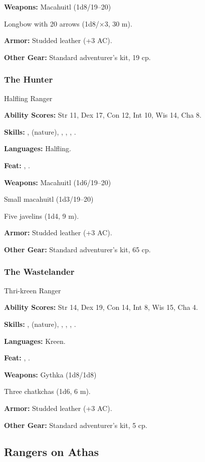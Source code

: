 \textbf{Weapons:} Macahuitl (1d8/19--20)

Longbow with 20 arrows (1d8/$\times$3, 30 m).

\textbf{Armor:} Studded leather (+3 AC).

\textbf{Other Gear:} Standard adventurer's kit, 19 cp.

\subsubsection{The Hunter}
Halfling Ranger

\textbf{Ability Scores:} Str 11, Dex 17, Con 12, Int 10, Wis 14, Cha 8.

\textbf{Skills:} ,  (nature), , , , .

\textbf{Languages:} Halfling.

\textbf{Feat:} , .

\textbf{Weapons:} Macahuitl (1d6/19--20)

Small macahuitl (1d3/19--20)

Five javelins (1d4, 9 m).

\textbf{Armor:} Studded leather (+3 AC).

\textbf{Other Gear:} Standard adventurer's kit, 65 cp.

\subsubsection{The Wastelander}
Thri-kreen Ranger

\textbf{Ability Scores:} Str 14, Dex 19, Con 14, Int 8, Wis 15, Cha 4.

\textbf{Skills:} ,  (nature), , , , .

\textbf{Languages:} Kreen.

\textbf{Feat:} , .

\textbf{Weapons:} Gythka (1d8/1d8)

Three chatkchas (1d6, 6 m).

\textbf{Armor:} Studded leather (+3 AC).

\textbf{Other Gear:} Standard adventurer's kit, 5 cp.

\subsection{Rangers on Athas}

